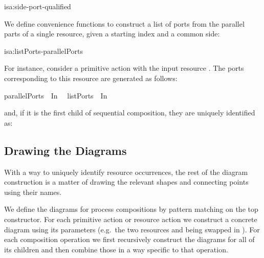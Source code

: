 \documentclass[class=smolathesis,crop=false]{standalone}
\begin{document}
\begin{isadef}{isa:side-port-qualified}
  
\item
  
\item
  
\end{isadef}
\cbend

We define convenience functions to construct a list of ports from the parallel parts of a single resource, given a starting index and a common side:
\begin{isadef}{isa:listPorts-parallelPorts}
\cbstart
  
\item
  
\cbend
\end{isadef}

For instance, consider a primitive action with the input resource .
The ports corresponding to this resource are generated as follows:
\begin{isabelle}
\centering
  parallelPorts\ \ In\ \isanewline
  \isacharequal\ listPorts\ \ In\ \isanewline
  \isacharequal\ 
\end{isabelle}
and, if it is the first child of sequential composition, they are uniquely identified as:
\begin{isabelle}
\centering
\end{isabelle}

\subsection{Drawing the Diagrams}
\label{sec:proc/diag/draw}

With a way to uniquely identify resource occurrences, the rest of the diagram construction is a matter of drawing the relevant shapes and connecting points using their names.

We define the diagrams for process compositions by pattern matching on the top constructor.
For each primitive action or resource action we construct a concrete diagram using its parameters (e.g.\ the two resources  and  being swapped in ).
For each composition operation we first recursively construct the diagrams for all of its children and then combine those in a way specific to that operation.
\end{document}
